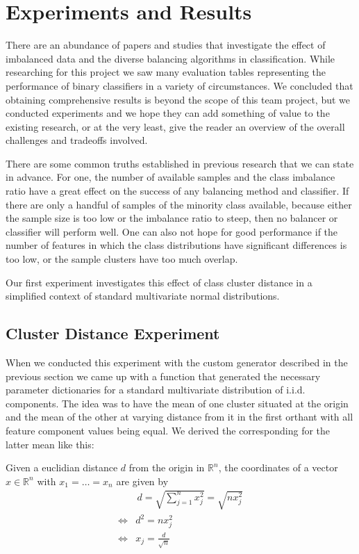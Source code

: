 \section{Experiments and Results}

There are an abundance of papers and studies that investigate the effect of imbalanced data and the diverse balancing algorithms in classification.
While researching for this project we saw many evaluation tables representing the performance of binary classifiers in a variety of circumstances.
We concluded that obtaining comprehensive results is beyond the scope of this team project, but we conducted experiments 
and we hope they can add something of value to the existing research, or at the very least, give the reader an overview of the overall challenges and tradeoffs involved.

There are some common truths established in previous research that we can state in advance.
For one, the number of available samples and the class imbalance ratio have a great effect on the success of any balancing method and classifier.
If there are only a handful of samples of the minority class available, because either the sample size is too low or the imbalance ratio to steep,
then no balancer or classifier will perform well.
One can also not hope for good performance if the number of features in which the class distributions have significant differences is too low, or
the sample clusters have too much overlap.

Our first experiment investigates this effect of class cluster distance in a simplified context of standard multivariate normal distributions.


\subsection{Cluster Distance Experiment}

When we conducted this experiment with the custom generator described in the previous section we came up with a function 
that generated the necessary parameter dictionaries for a standard multivariate distribution of i.i.d. components.
The idea was to have the mean of one cluster situated at the origin and the mean of the other at varying distance from it in the first orthant with all feature component
values being equal. We derived the corresponding for the latter mean like this:

Given a euclidian distance $d$ from the origin in $\mathbb{R}^n$, the coordinates of a vector $x \in \mathbb{R}^n$ with $x_1 = \dots = x_n$ are given by
\[
\begin{aligned}
	& \, d = \sqrt{ \sum_{j =1}^n x_j^2} = \sqrt{ n x_j^2} \\
	\Leftrightarrow& d^2 = n x_j^2 \\ 
	\Leftrightarrow& x_j = \frac{d}{\sqrt{n}} \\ 
\end{aligned}
\]

